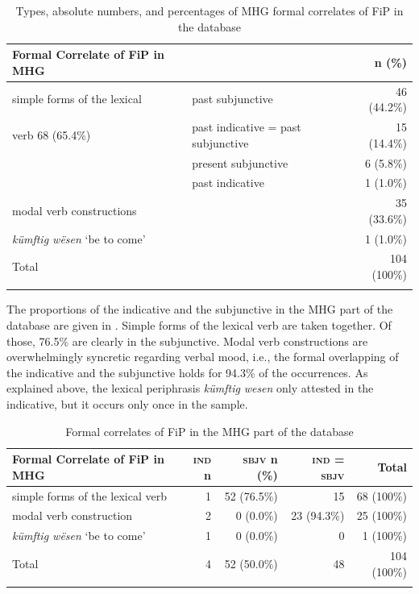 \documentclass[output=paper,colorlinks,citecolor=brown]{langscibook}
\begin{document}
\begin{table}\small%
    \begin{tabularx}{\textwidth}{Qlr}
        \lsptoprule
        {Formal Correlate of FiP in MHG} & & {n (\%)} \\
        \midrule
        {simple forms of the lexical} & past subjunctive & 46 (44.2\%) \\
        verb 68 (65.4\%) & past indicative = past subjunctive & 15 (14.4\%) \\
         & present subjunctive & 6 (5.8\%) \\
         & past indicative & 1 (1.0\%) \\
        \midrule
        modal verb constructions & & 35 (33.6\%) \\
        \midrule
        \textit{kümftig wësen} ‘be to come’ & & 1 (1.0\%) \\
        \midrule
        {Total} & & 104 (100\%) \\
        \lspbottomrule
    \end{tabularx}
    \caption{Types, absolute numbers, and percentages of MHG formal correlates of FiP in the database}
    \label{tab:4}
\end{table}


The proportions of the indicative and the subjunctive in the MHG part of the database are given in  . Simple forms of the lexical verb are taken together. Of those, 76.5\% are clearly in the subjunctive. Modal verb constructions are overwhelmingly syncretic regarding verbal mood, i.e., the formal overlapping of the indicative and the subjunctive holds for 94.3\% of the occurrences. As explained above, the lexical periphrasis \textit{kümftig} \textit{wesen} only attested in the indicative, but it occurs only once in the sample.

\begin{table}\small
    \begin{tabular}{lrrrr}
        \lsptoprule
        {Formal Correlate of FiP in MHG} & {\textsc{ind} n} & {\textsc{sbjv} n (\%)} & {\textsc{ind} = \textsc{sbjv}} & {Total}\\
        \midrule
        simple forms of the lexical verb & 1 & 52 (76.5\%) & 15 & 68 (100\%) \\
        modal verb construction & 2 & 0 (0.0\%) & 23 (94.3\%) & 25 (100\%) \\
        \textit{kümftig wësen} ‘be to come’ & 1 & 0 (0.0\%) & 0 & 1 (100\%) \\
        \midrule
        {Total} & 4 & 52 (50.0\%) & 48 & 104 (100\%) \\
        \lspbottomrule
    \end{tabular}
    \caption{Formal correlates of FiP in the MHG part of the database}
    \label{tab:5}
\end{table}
\end{document}
